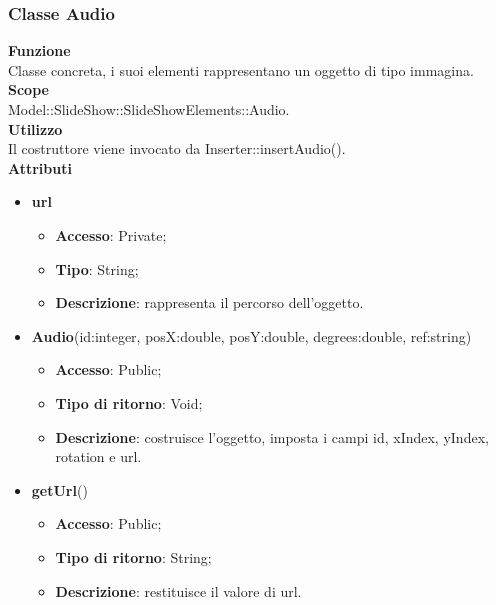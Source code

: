 {	\subsubsection{Classe Audio}{
		\label{Audio}
		\textbf{Funzione}\\
			\indent Classe concreta, i suoi elementi rappresentano un oggetto di tipo immagina.\\
	   	\textbf{Scope}\\
			\indent Model::SlideShow::SlideShowElements::Audio.\\
		\textbf{Utilizzo}\\
			\indent Il costruttore viene invocato da Inserter::insertAudio().\\
		\textbf{Attributi}
		\begin{itemize}
			\item \textbf{url}
			\begin{itemize}
				\item \textbf{Accesso}: Private;
				\item \textbf{Tipo}: String;
				\item \textbf{Descrizione}: rappresenta il percorso dell’oggetto.
			\end{itemize}
		\end{itemize}
		\begin{itemize}
			\item \textbf{Audio}(id:integer, posX:double, posY:double, degrees:double, ref:string)
			\begin{itemize}
				\item \textbf{Accesso}: Public;
				\item \textbf{Tipo di ritorno}: Void;
				\item \textbf{Descrizione}: costruisce l’oggetto, imposta i campi id, xIndex, yIndex, rotation e url.
			\end{itemize}
			\item \textbf{getUrl}()
			\begin{itemize}
				\item \textbf{Accesso}: Public;
				\item \textbf{Tipo di ritorno}: String;
				\item \textbf{Descrizione}: restituisce il valore di url.
			\end{itemize}
		\end{itemize}
		}
	
}
